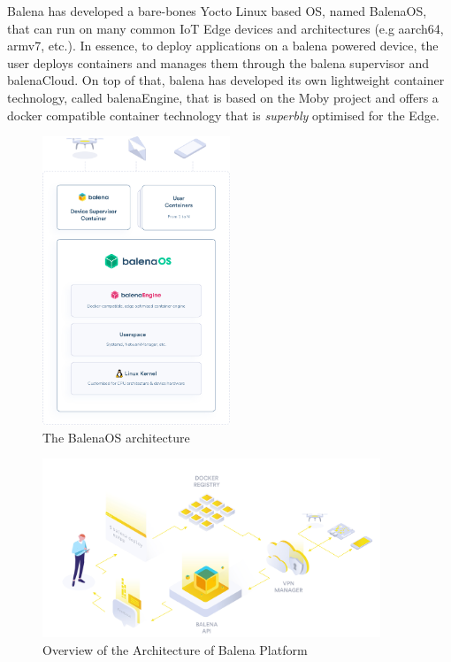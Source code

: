 Balena has developed a bare-bones Yocto Linux based OS, named BalenaOS\cite{balenaos}, that can run on many common IoT Edge devices and architectures (e.g aarch64, armv7, etc.). In essence, to deploy applications on a balena powered device, the user deploys containers and manages them through the balena supervisor and balenaCloud\cite{balenacloud}. On top of that, balena has developed its own lightweight container technology, called balenaEngine\cite{balenaengine}, that is based on the Moby project and offers a docker compatible container technology that is \textit{superbly} optimised for the Edge.

\begin{figure}[h]
    \centering
    \includegraphics[width=0.5\textwidth]{images/balena_arch.png}
    \caption{The BalenaOS architecture \cite{balenaos}}
    \label{fig:balena_arch}
\end{figure}

\begin{figure}[h]
    \centering
    \includegraphics[width=0.9\textwidth]{images/balena_gen_arch.jpg}
    \caption{Overview of the Architecture of Balena Platform \cite{balena}}
    \label{fig:balena_gen_arch}
\end{figure}
\clearpage

